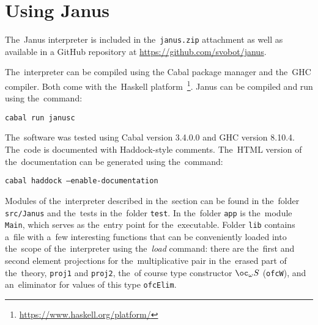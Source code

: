 \chapter{Using Janus}

The~Janus interpreter is included in the~\texttt{janus.zip} attachment as well
as available in a GitHub repository at \url{https://github.com/svobot/janus}.

The~interpreter can be compiled using the Cabal package manager and the~GHC
compiler. Both come with the~Haskell
platform~\footnote{\url{https://www.haskell.org/platform/}}. Janus can be
compiled and run using the~command:
\begin{center}
  \texttt{cabal run janusc}
\end{center}
The~software was tested using Cabal version 3.4.0.0 and GHC version 8.10.4.
The~code is documented with Haddock-style comments. The~HTML version of
the~documentation can be generated using the~command:
\begin{center}
  \texttt{cabal haddock --enable-documentation}
\end{center}

Modules of the~interpreter described in the~section 
can be found in the~folder \texttt{src/Janus} and the~tests in the~folder
\texttt{test}. In the~folder \texttt{app} is the~module \texttt{Main}, which
serves as the~entry point for the~executable. Folder \texttt{lib} contains
a~file with a~few interesting functions that can be conveniently loaded into
the~scope of the~interpreter using the~\emph{load} command: there are
the~first and second element projections for the~multiplicative pair in
the~erased part of the~theory, \texttt{proj1} and \texttt{proj2}, the~of course
type constructor $\oc_\omega S$ (\texttt{ofcW}), and an~eliminator for values of
this type \texttt{ofcElim}.
